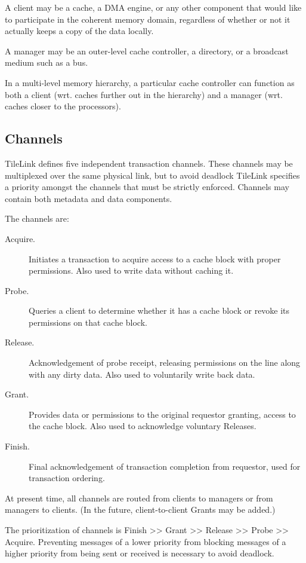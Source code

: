 A client may be a cache, a DMA engine, or any other component that would like to participate in the coherent memory domain, regardless of whether or not it actually keeps a copy of the data locally.

A manager may be an outer-level cache controller, a directory, or a broadcast medium such as a bus. 

In a multi-level memory hierarchy, a particular cache controller can function as both a client (wrt. caches further out in the hierarchy) and a manager (wrt. caches closer to the processors).

\subsection{Channels}

TileLink defines five independent transaction channels.
These channels may be multiplexed over the same physical link, but to avoid deadlock TileLink specifies a priority amongst the channels that must be strictly enforced.
Channels may contain both metadata and data components.

The channels are:
\begin{description}
\item[Acquire.] Initiates a transaction to acquire access to a cache block with proper permissions. Also used to write data without caching it.
\item[Probe.] Queries a client to determine whether it has a cache block or revoke its permissions on that cache block.
\item[Release.] Acknowledgement of probe receipt, releasing permissions on the line along with any dirty data. Also used to voluntarily write back data.
\item[Grant.] Provides data or permissions to the original requestor granting, access to the cache block. Also used to acknowledge voluntary Releases.
\item[Finish.] Final acknowledgement of transaction completion from requestor, used for transaction ordering.
\end{description}

At present time, all channels are routed from clients to managers or from managers to clients. (In the future, client-to-client Grants may be added.)

The prioritization of channels is Finish >> Grant >> Release >> Probe >> Acquire.
Preventing messages of a lower priority from blocking messages of a higher priority from being sent or received is necessary to avoid deadlock.

